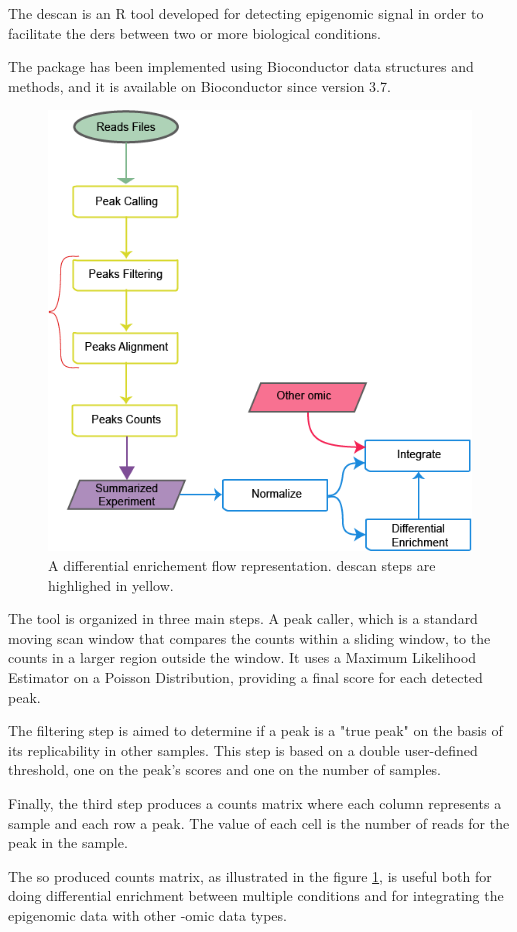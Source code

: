 The \gls{descan} is an R \cite{Ihaka1996} tool developed for detecting epigenomic signal in order to facilitate the \glspl{der} between two or more biological conditions.

The package has been implemented using Bioconductor \cite{Gentleman2004} data structures and methods, and it is available on Bioconductor since version 3.7.

\begin{figure}[H]
\centering
\includegraphics[width=\textwidth,height=\textheight,keepaspectratio]{img/descan2/flow.png}
\caption[DEScan2 workflow]{A differential enrichement flow representation. \gls{descan} steps are highlighed in yellow.}
\label{fig:descan2flow}
\end{figure}

The tool is organized in three main steps. 
A peak caller, which is a standard moving scan window that compares the counts within a sliding window, to the counts in a larger region outside the window. It uses a Maximum Likelihood Estimator on a Poisson Distribution, providing a final score for each detected peak.


The filtering step is aimed to determine if a peak is a "true peak" on the basis of its replicability in other samples. This step is based on a double user-defined threshold, one on the peak's scores and one on the number of samples.


Finally, the third step produces a counts matrix where each column represents a sample and each row a peak. The value of each cell is the number of reads for the peak in the sample.

The so produced counts matrix, as illustrated in the figure \ref{fig:descan2flow}, is useful both for doing differential enrichment between multiple conditions and for integrating the epigenomic data with other -omic data types.




